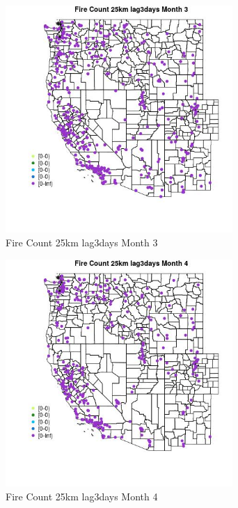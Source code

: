 \begin{figure} 
\centering  
\includegraphics[width=0.77\textwidth]{Code_Outputs/Report_ML_input_PM25_Step4_part_e_de_duplicated_aves_compiled_2019-05-18wNAs_MapObsMo3Fire_Count_25km_lag3days.jpg} 
\caption{\label{fig:Report_ML_input_PM25_Step4_part_e_de_duplicated_aves_compiled_2019-05-18wNAsMapObsMo3Fire_Count_25km_lag3days}Fire Count 25km lag3days Month 3} 
\end{figure} 
 

\begin{figure} 
\centering  
\includegraphics[width=0.77\textwidth]{Code_Outputs/Report_ML_input_PM25_Step4_part_e_de_duplicated_aves_compiled_2019-05-18wNAs_MapObsMo4Fire_Count_25km_lag3days.jpg} 
\caption{\label{fig:Report_ML_input_PM25_Step4_part_e_de_duplicated_aves_compiled_2019-05-18wNAsMapObsMo4Fire_Count_25km_lag3days}Fire Count 25km lag3days Month 4} 
\end{figure} 
 

